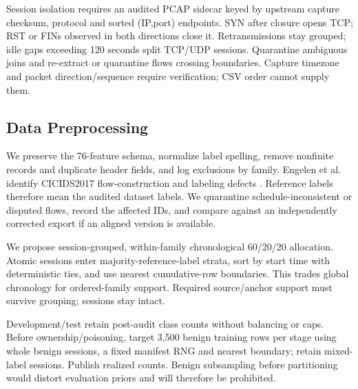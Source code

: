 \documentclass[10pt,a4paper]{article}
\begin{document}
Session isolation requires an audited PCAP sidecar keyed by upstream capture checksum, protocol and sorted (IP,port) endpoints. SYN after closure opens TCP; RST or FINs observed in both directions close it. Retransmissions stay grouped; idle gaps exceeding 120 seconds split TCP/UDP sessions. Quarantine ambiguous joins and re-extract or quarantine flows crossing boundaries. Capture timezone and packet direction/sequence require verification; CSV order cannot supply them.

\subsection{Data Preprocessing}
We preserve the 76-feature schema, normalize label spelling, remove nonfinite records and duplicate header fields, and log exclusions by family. Engelen et al. identify CICIDS2017 flow-construction and labeling defects \cite{engelen}. Reference labels therefore mean the audited dataset labels. We quarantine schedule-inconsistent or disputed flows, record the affected IDs, and compare against an independently corrected export if an aligned version is available.

We propose session-grouped, within-family chronological 60/20/20 allocation. Atomic sessions enter majority-reference-label strata, sort by start time with deterministic ties, and use nearest cumulative-row boundaries. This trades global chronology for ordered-family support. Required source/anchor support must survive grouping; sessions stay intact.

Development/test retain post-audit class counts without balancing or caps. Before ownership/poisoning, target 3,500 benign training rows per stage using whole benign sessions, a fixed manifest RNG and nearest boundary; retain mixed-label sessions. Publish realized counts. Benign subsampling before partitioning would distort evaluation priors and will therefore be prohibited.
\end{document}
